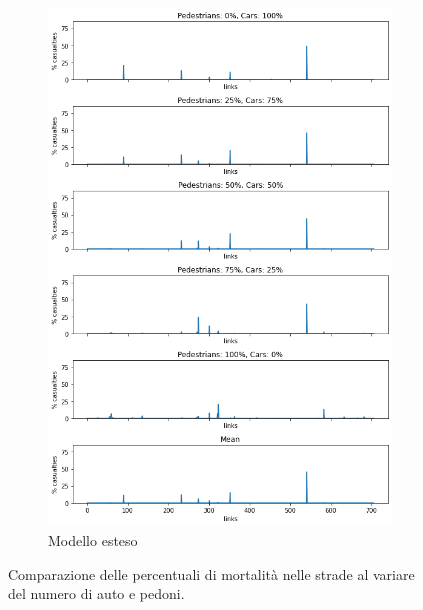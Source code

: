 \begin{figure}[ht]
\begin{subfigure}{0.45\textwidth}
        \includegraphics[width=\textwidth]{images/analisi/new_links_casualties}
        \caption{Modello esteso}
        \label{fig:new-link-casualties}
    \end{subfigure}
    \caption{Comparazione delle percentuali di mortalità nelle strade al variare del numero di auto e pedoni.}
    \label{fig:analisi-comparison-critical-links1}
\end{figure}

\pagebreak

